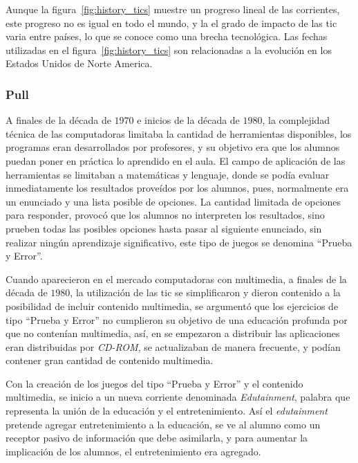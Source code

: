 Aunque la figura~\ref{fig:history_tics} muestre un progreso lineal de las
corrientes, este progreso no es igual en todo el mundo, y la el grado de impacto
de las \Gls{tic} varia entre países, lo que se conoce como una brecha
tecnológica. Las fechas utilizadas en el figura~\ref{fig:history_tics} son
relacionadas a la evolución en los Estados Unidos de Norte America.

\subsubsection{Pull}

A finales de la década de $1970$ e inicios de la década de $1980$,  la
complejidad técnica de las computadoras limitaba la cantidad de herramientas
disponibles, los programas eran desarrollados por profesores, y su objetivo era
que los alumnos puedan poner en práctica lo aprendido en el aula. El campo de
aplicación de las herramientas se limitaban a matemáticas y lenguaje, donde se
podía evaluar inmediatamente los resultados proveídos por los alumnos, pues,
normalmente era un enunciado y una lista posible de opciones. La cantidad
limitada de opciones para responder, provocó que los alumnos no interpreten los
resultados, sino prueben todas las posibles opciones hasta pasar al siguiente
enunciado, sin realizar ningún aprendizaje significativo\cite{leinonen:ict},
este tipo de juegos se denomina \enquote{Prueba y Error}.

Cuando aparecieron en el mercado computadoras con multimedia, a finales de la
década de $1980$, la utilización de las \Gls{tic} se simplificaron y dieron
contenido a la posibilidad de incluir contenido multimedia, se argumentó que los
ejercicios de tipo \enquote{Prueba y Error} no cumplieron su objetivo de una
educación profunda por que no contenían multimedia\cite{leinonen:ict}, así, en
se empezaron a distribuir las aplicaciones eran distribuidas por
\textit{CD-ROM}, se actualizaban de manera frecuente, y podían contener gran
cantidad de contenido multimedia.

Con la creación de los juegos del tipo \enquote{Prueba y Error} y el contenido
multimedia, se inicio a un nueva corriente denominada \emph{Edutainment},
palabra que representa la unión de la educación y el entretenimiento. Así el
\emph{edutainment} pretende agregar entretenimiento a la educación, se ve al
alumno como un receptor pasivo de información que debe asimilarla, y para
aumentar la implicación de los alumnos, el entretenimiento era
agregado\cite{resnick:2004}.

